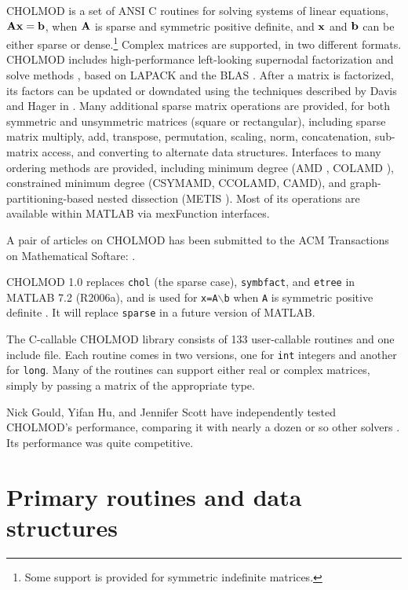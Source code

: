 \documentclass[11pt]{article}
\newcommand{\m}[1]{{\bf{#1}}}       %
\begin{document}
CHOLMOD is a set of ANSI C routines for solving systems of linear
equations, $\m{Ax}=\m{b}$, when $\m{A}$ is sparse and symmetric positive definite,
and $\m{x}$ and $\m{b}$ can be either sparse or dense.\footnote{Some support
is provided for symmetric indefinite matrices.}
Complex matrices are supported, in two different formats.
CHOLMOD includes high-performance left-looking supernodal factorization
and solve methods \cite{NgPeyton91b},
based on LAPACK \cite{LAPACK} and the BLAS \cite{ACM679a}.
After a matrix is factorized, its factors can be updated or downdated using
the techniques described by Davis and Hager
in \cite{DavisHager99,DavisHager01,DavisHager05}.
Many additional sparse matrix operations are provided, for both
symmetric and unsymmetric matrices (square or rectangular), including
sparse matrix multiply, add, transpose, permutation, scaling,
norm, concatenation, sub-matrix access, and converting to alternate data structures.
Interfaces to many ordering methods are provided, including minimum degree
(AMD \cite{AmestoyDavisDuff96,AmestoyDavisDuff03},
COLAMD \cite{DavisGilbertLarimoreNg00_algo,DavisGilbertLarimoreNg00}),
constrained minimum degree (CSYMAMD, CCOLAMD, CAMD), and
graph-partitioning-based nested dissection (METIS \cite{KarypisKumar98}).
Most of its operations are available within MATLAB via mexFunction interfaces.

A pair of articles on CHOLMOD has been submitted to the ACM Transactions
on Mathematical Softare:
\cite{ChenDavisHagerRajamanickam06,DavisHager06}.

CHOLMOD 1.0 replaces {\tt chol} (the sparse case), {\tt symbfact}, and {\tt etree}
in MATLAB 7.2 (R2006a), and is used for {\tt x=A}$\backslash${\tt b}
when {\tt A} is symmetric positive definite \cite{GilbertMolerSchreiber}.
It will replace {\tt sparse} in a future version of MATLAB.

The C-callable CHOLMOD library consists of 133 user-callable routines and one
include file.  Each routine comes in two versions, one for {\tt int} integers
and another for {\tt long}.  Many of the routines can support either real or
complex matrices, simply by passing a matrix of the appropriate type.

Nick Gould, Yifan Hu, and Jennifer Scott have independently tested CHOLMOD's
performance, comparing it with nearly a dozen or so other solvers
\cite{GouldHuScott05,GouldHuScott05b}.  Its performance was quite competitive.

\newpage \section{Primary routines and data structures}
\end{document}
